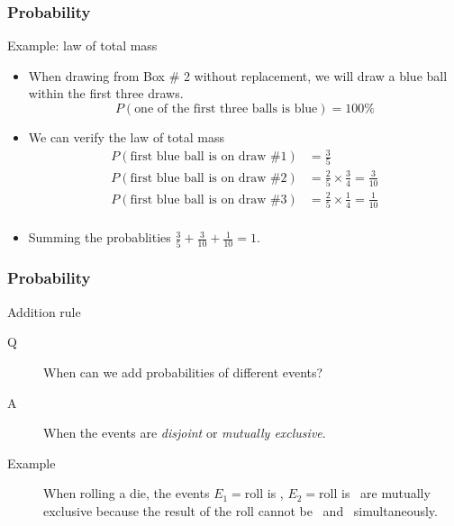 \documentclass[handout]{beamer}
\begin{document}
   \begin{frame} \frametitle{Probability}

   \begin{block}
   {Example: law of total mass}
   \begin{itemize}
   \item  When drawing from Box \# 2 without replacement,
   we will draw a blue ball within the first three draws.
   $$
   P(\text{one of the first three balls is blue}) = 100 \%
   $$
   \item We can verify the law of total mass
   $$
   \begin{aligned}
   P(\text{first blue ball is on draw \# 1}) &= \frac{3}{5} \\
   P(\text{first blue ball is on draw \# 2}) &= \frac{2}{5} \times \frac{3}{4} = \frac{3}{10}  \\
   P(\text{first blue ball is on draw \# 3}) &= \frac{2}{5} \times \frac{1}{4} = \frac{1}{10}  \\
   \end{aligned}
   $$
   \item Summing the probablities $\frac{3}{5} + \frac{3}{10} +
   \frac{1}{10} = 1.$
   \end{itemize}

   \end{block}
   \end{frame}


   \begin{frame} \frametitle{Probability}

   \begin{block}
   {Addition rule}
   \begin{description}
   \item[Q] When can we add probabilities of different events?
   \item[A] When the events are {\em disjoint} or {\em mutually exclusive}.
   \item[Example] When rolling a die, the events
   $E_1=$roll is , $E_2=$roll is  \, are
   mutually exclusive
   because the result of the roll cannot be  \, and  \,
   simultaneously.
   \end{description}
   \end{block}
   \end{frame}

\end{document}
